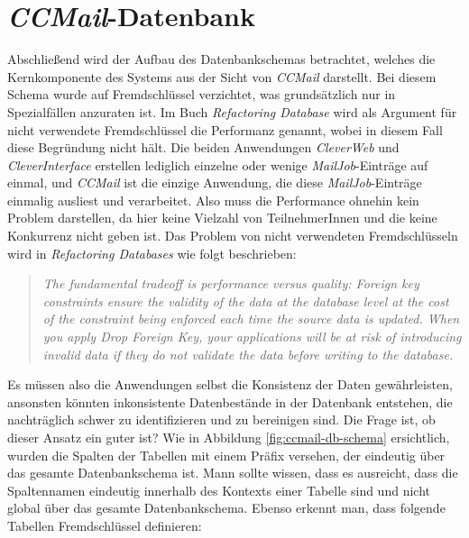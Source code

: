 \section{\emph{CCMail}-Datenbank}
\label{sec:ccmail-datanbank}
Abschließend wird der Aufbau des Datenbankschemas betrachtet, welches die Kernkomponente des Systems aus der Sicht von \emph{CCMail} darstellt. Bei diesem Schema wurde auf Fremdschlüssel verzichtet, was grundsätzlich nur in Spezialfällen anzuraten ist.
\newline
\newline 
Im Buch \emph{Refactoring Database} \cite[213]{refactoreDatabase} wird als Argument für nicht verwendete Fremdschlüssel die Performanz genannt, wobei in diesem Fall diese Begründung nicht hält. Die beiden Anwendungen \emph{CleverWeb} und \emph{CleverInterface} erstellen lediglich einzelne oder wenige \emph{MailJob}-Einträge auf einmal, und \emph{CCMail} ist die einzige Anwendung, die diese \emph{MailJob}-Einträge einmalig ausliest und verarbeitet. Also muss die Performance ohnehin kein Problem darstellen, da hier keine Vielzahl von TeilnehmerInnen und die keine Konkurrenz nicht geben ist. Das Problem von nicht verwendeten Fremdschlüsseln wird in \emph{Refactoring Databases} \cite[213]{refactoreDatabase} wie folgt beschrieben:
\begin{quote}
\emph{The fundamental tradeoff is performance versus quality: Foreign key constraints ensure the validity of the data at the database level at the cost of the constraint being enforced each time the source data is updated. When you apply Drop Foreign Key, your applications will be at risk of introducing invalid data if they do not validate the data before writing to the database.}
\end{quote}
Es müssen also die Anwendungen selbst die Konsistenz der Daten gewährleisten, ansonsten könnten inkonsistente Datenbestände in der Datenbank entstehen, die nachträglich schwer zu identifizieren und zu bereinigen sind. Die Frage ist, ob dieser Ansatz ein guter ist?
\newline
\newline
Wie in Abbildung \ref{fig:ccmail-db-schema} ersichtlich, wurden die Spalten der Tabellen mit einem Präfix versehen, der eindeutig über das gesamte Datenbankschema ist. Mann sollte wissen, dass es ausreicht, dass die Spaltennamen eindeutig innerhalb des Kontexts einer Tabelle sind und nicht global über das gesamte Datenbankschema. Ebenso erkennt man, dass folgende Tabellen Fremdschlüssel definieren: 
